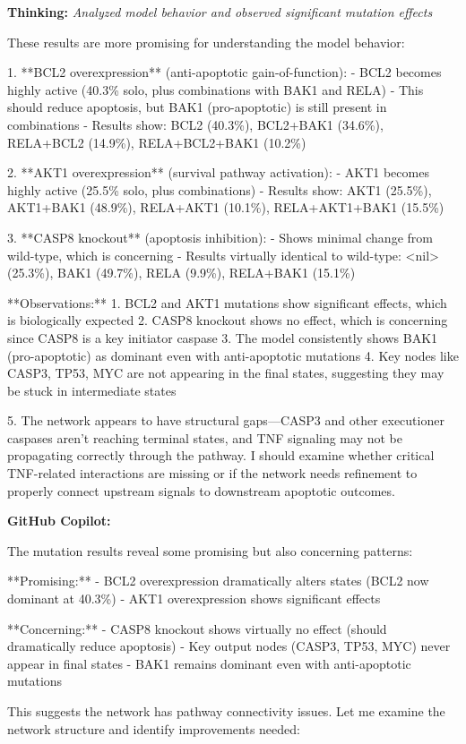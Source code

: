 \documentclass[11pt,a4paper]{article}
\begin{document}
\begin{thinkbox}
\textbf{Thinking:} \textit{Analyzed model behavior and observed significant mutation effects}

These results are more promising for understanding the model behavior:

1. **BCL2 overexpression** (anti-apoptotic gain-of-function):   - BCL2 becomes highly active (40.3\% solo, plus combinations with BAK1 and RELA)
   - This should reduce apoptosis, but BAK1 (pro-apoptotic) is still present in combinations
   - Results show: BCL2 (40.3\%), BCL2+BAK1 (34.6\%), RELA+BCL2 (14.9\%), RELA+BCL2+BAK1 (10.2\%)

2. **AKT1 overexpression** (survival pathway activation):
   - AKT1 becomes highly active (25.5\% solo, plus combinations)
   - Results show: AKT1 (25.5\%), AKT1+BAK1 (48.9\%), RELA+AKT1 (10.1\%), RELA+AKT1+BAK1 (15.5\%)

3. **CASP8 knockout** (apoptosis inhibition):
   - Shows minimal change from wild-type, which is concerning
   - Results virtually identical to wild-type: <nil> (25.3\%), BAK1 (49.7\%), RELA (9.9\%), RELA+BAK1 (15.1\%)

**Observations:**
1. BCL2 and AKT1 mutations show significant effects, which is biologically expected
2. CASP8 knockout shows no effect, which is concerning since CASP8 is a key initiator caspase 
3. The model consistently shows BAK1 (pro-apoptotic) as dominant even with anti-apoptotic mutations
4. Key nodes like CASP3, TP53, MYC are not appearing in the final states, suggesting they may be stuck in intermediate states

5. The network appears to have structural gaps—CASP3 and other executioner caspases aren't reaching terminal states, and TNF signaling may not be propagating correctly through the pathway. I should examine whether critical TNF-related interactions are missing or if the network needs refinement to properly connect upstream signals to downstream apoptotic outcomes.

\end{thinkbox}
\begin{copilotbox}
\textbf{GitHub Copilot:}

The mutation results reveal some promising but also concerning patterns:

**Promising:**
- BCL2 overexpression dramatically alters states (BCL2 now dominant at 40.3\%)
- AKT1 overexpression shows significant effects

**Concerning:**  
- CASP8 knockout shows virtually no effect (should dramatically reduce apoptosis)
- Key output nodes (CASP3, TP53, MYC) never appear in final states
- BAK1 remains dominant even with anti-apoptotic mutations

This suggests the network has pathway connectivity issues. Let me examine the network structure and identify improvements needed:

\end{copilotbox}
\end{document}
